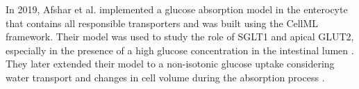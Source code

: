 \documentclass[fleqn,10pt]{physiome}
\begin{document}




In 2019, Afshar et al. implemented a glucose absorption model in the enterocyte that contains all responsible transporters and was built using the CellML framework. Their model was used to study the role of SGLT1 and apical GLUT2, especially in the presence of a high glucose concentration in the intestinal lumen \citep{afshar2019computational}. They later extended their model to a non-isotonic glucose uptake considering water transport and changes in cell volume during the absorption process \citep{afshar2021computational}. 
\end{document}
